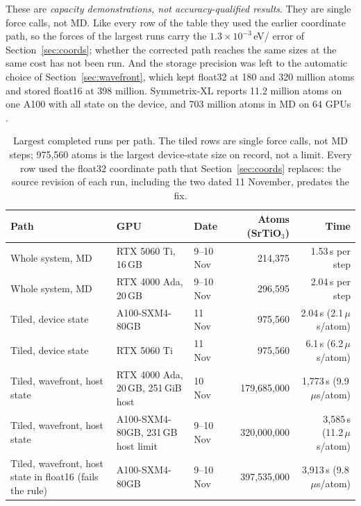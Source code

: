 \documentclass[11pt]{article}
\newcommand{\angstrom}{\text{\AA}}
\newcommand{\us}{\,\ensuremath{\mu}s}
\begin{document}
These are \emph{capacity demonstrations, not accuracy-qualified results}. They are single force calls, not MD.
Like every row of the table they used the earlier coordinate path, so the forces of the largest runs carry the
$1.3\times10^{-3}$\,eV/\angstrom{} error of Section~\ref{sec:coords}; whether the corrected path reaches the same
sizes at the same cost has not been run.
And the storage precision was left to the automatic choice of Section~\ref{sec:wavefront}, which kept float32 at
180 and 320 million atoms and stored float16 at 398 million. Symmetrix-XL reports 11.2 million atoms on one A100
with all state on the device, and 703 million atoms in MD on 64 GPUs \cite{fu2026symmetrixxl}.

\begin{table}[t]
\centering
\small
\setlength{\tabcolsep}{4pt}
\begin{tabularx}{\textwidth}{>{\raggedright\arraybackslash}p{3.7cm}Ylrr}
\toprule
Path & GPU & Date & Atoms (SrTiO$_3$) & Time \\
\midrule
Whole system, MD      & RTX 5060 Ti, 16\,GB      & 9--10 Nov & 214{,}375       & 1.53\,s per step \\
Whole system, MD      & RTX 4000 Ada, 20\,GB     & 9--10 Nov & 296{,}595       & 2.04\,s per step \\ \addlinespace[3pt]
Tiled, device state   & A100-SXM4-80GB           & 11 Nov & 975{,}560       & 2.04\,s (2.1\us/atom) \\
Tiled, device state   & RTX 5060 Ti              & 11 Nov & 975{,}560       & 6.1\,s (6.2\us/atom) \\ \addlinespace[3pt]
Tiled, wavefront, host state & RTX 4000 Ada, 20\,GB, 251\,GiB host & 10 Nov & 179{,}685{,}000 & 1{,}773\,s (9.9\us/atom) \\
\addlinespace[3pt]
Tiled, wavefront, host state & A100-SXM4-80GB, 231\,GB host limit & 9--10 Nov & 320{,}000{,}000 & 3{,}585\,s (11.2\us/atom) \\
\addlinespace[3pt]
Tiled, wavefront, host state in float16 (fails the rule) & A100-SXM4-80GB & 9--10 Nov & 397{,}535{,}000 & 3{,}913\,s (9.8\us/atom) \\
\bottomrule
\end{tabularx}
\caption{Largest completed runs per path. The tiled rows are single force calls, not MD steps; 975{,}560 atoms
is the largest device-state size on record, not a limit. Every row used the float32 coordinate path that
Section~\ref{sec:coords} replaces: the source revision of each run, including the two dated 11 November,
predates the fix.}
\label{tab:capacity}
\end{table}
\end{document}
